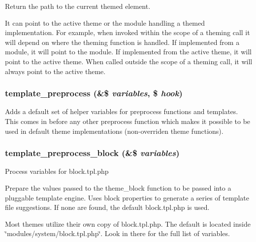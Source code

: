 Return the path to the current themed element.

It can point to the active theme or the module handling a themed implementation. For example, when invoked within the scope of a theming call it will depend on where the theming function is handled. If implemented from a module, it will point to the module. If implemented from the active theme, it will point to the active theme. When called outside the scope of a theming call, it will always point to the active theme. \hypertarget{includes_2theme_8inc_3eeb7bcdba7ef4859f99586da264d347}{
\subsubsection[{template\_\-preprocess}]{\setlength{\rightskip}{0pt plus 5cm}template\_\-preprocess (\&\$ {\em variables}, \/  \$ {\em hook})}}
\label{includes_2theme_8inc_3eeb7bcdba7ef4859f99586da264d347}


Adds a default set of helper variables for preprocess functions and templates. This comes in before any other preprocess function which makes it possible to be used in default theme implementations (non-overriden theme functions). \hypertarget{includes_2theme_8inc_f4bcb538ddb98ffdd9ec8037631f10fa}{
\subsubsection[{template\_\-preprocess\_\-block}]{\setlength{\rightskip}{0pt plus 5cm}template\_\-preprocess\_\-block (\&\$ {\em variables})}}
\label{includes_2theme_8inc_f4bcb538ddb98ffdd9ec8037631f10fa}


Process variables for block.tpl.php

Prepare the values passed to the theme\_\-block function to be passed into a pluggable template engine. Uses block properties to generate a series of template file suggestions. If none are found, the default block.tpl.php is used.

Most themes utilize their own copy of block.tpl.php. The default is located inside \char`\"{}modules/system/block.tpl.php\char`\"{}. Look in there for the full list of variables.

